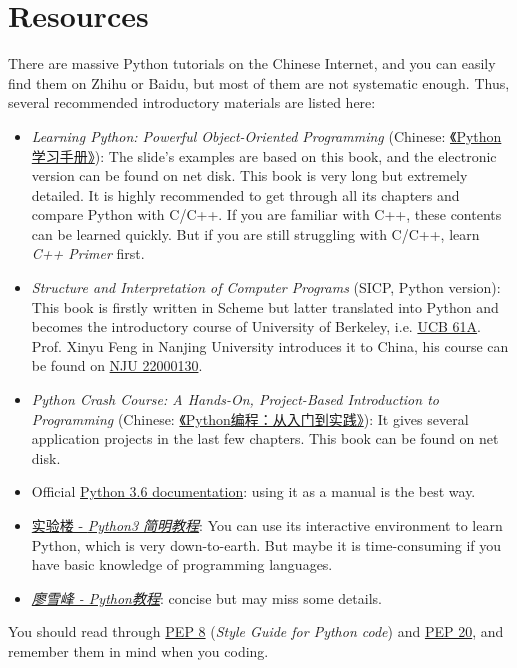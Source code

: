\documentclass[english]{../TexTemplate/thesis}
\begin{document}
\section{Resources}
There are massive Python tutorials on the Chinese Internet, and you can easily find them on Zhihu or Baidu, but most of them are not systematic enough.
Thus, several recommended introductory materials are listed here:
\begin{itemize}
	\item \emph{Learning Python: Powerful Object-Oriented Programming} (Chinese: \href{https://item.jd.com/12452929.html}{《Python学习手册》}): The slide's examples are based on this book, and the electronic version can be found on net disk. This book is very long but extremely detailed. It is highly recommended to get through all its chapters and compare Python with C/C++. If you are familiar with C++, these contents can be learned quickly. But if you are still struggling with C/C++, learn \emph{C++ Primer} first.
	\item \emph{Structure and Interpretation of Computer Programs} (SICP, Python version): This book is firstly written in Scheme but latter translated into Python and becomes the introductory course of University of Berkeley, i.e. \href{https://cs61a.org/}{UCB 61A}.
	Prof. Xinyu Feng in Nanjing University introduces it to China, his course can be found on \href{https://cs.nju.edu.cn/xyfeng/teaching/SICP/}{NJU 22000130}.
	\item \emph{Python Crash Course: A Hands-On, Project-Based Introduction to Programming} (Chinese: \href{https://item.jd.com/11993134.html}{《Python编程：从入门到实践》}): It gives several application projects in the last few chapters. This book can be found on net disk.
	\item Official \href{https://docs.python.org/3.6/}{Python 3.6 documentation}: using it as a manual is the best way.
	\item \href{https://www.shiyanlou.com/courses/596}{实验楼 - \emph{Python3 简明教程}}: You can use its interactive environment to learn Python, which is very down-to-earth. But maybe it is time-consuming if you have basic knowledge of programming languages.
	\item \emph{\href{https://www.liaoxuefeng.com/wiki/1016959663602400}{廖雪峰 - Python教程}}: concise but may miss some details.
\end{itemize}

You should read through \href{https://www.python.org/dev/peps/pep-0008/}{PEP 8} (\emph{Style Guide for Python code}) and \href{https://www.python.org/dev/peps/pep-0020/}{PEP 20}, and remember them in mind when you coding.
\end{document}
